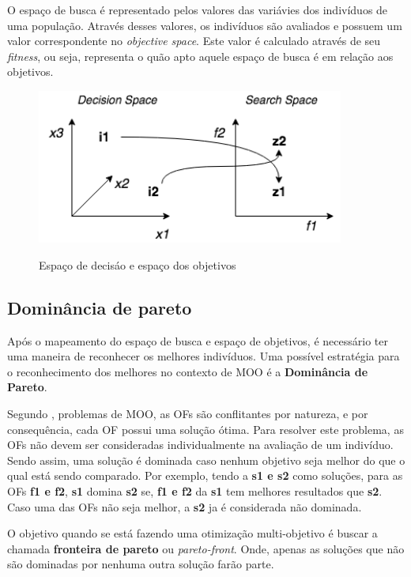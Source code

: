 O espaço de busca é representado pelos valores das variávies dos 
indivíduos de uma população. Através desses valores, os indivíduos
são avaliados e possuem um valor correspondente no \textit{objective space}. 
Este valor é calculado através de seu \textit{fitness}, ou seja, representa
o quão apto aquele espaço de busca é em relação aos objetivos.

\begin{figure}[!htb]
  \centering
  \caption{Espaço de decisáo e espaço dos objetivos}
  \includegraphics[width=0.9\textwidth]{./dados/figuras/searchspace-decisionspace.png}
  \label{fig:moospaces}
\end{figure}

\subsection{Dominância de pareto}
Após o mapeamento do espaço de busca e espaço de objetivos, é necessário
ter uma maneira de reconhecer os melhores indivíduos. Uma possível
estratégia para o reconhecimento dos melhores no contexto de MOO 
é a \textbf{Dominância de Pareto}.

Segundo \cite{ghosh}, problemas de MOO, as OFs são conflitantes por natureza, e 
por consequência, cada OF possui uma solução ótima. Para resolver este problema,
as OFs não devem ser consideradas individualmente na avaliação de um indivíduo.
Sendo assim, uma solução é dominada caso nenhum objetivo seja melhor do que
o qual está sendo comparado. Por exemplo, tendo a \textbf{s1 e s2} como soluções,
para as OFs \textbf{f1 e f2}, \textbf{s1} domina \textbf{s2} se, \textbf{f1 e f2}
da \textbf{s1} tem melhores resultados que \textbf{s2}. 
Caso uma das OFs não seja melhor, a \textbf{s2} ja é considerada não dominada.

O objetivo quando se está fazendo uma otimização multi-objetivo é buscar
a chamada \textbf{fronteira de pareto} ou \textit{pareto-front}. Onde, apenas
as soluções que não são dominadas por nenhuma outra solução farão parte. 

